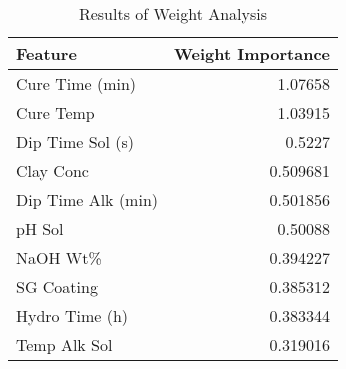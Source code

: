 
    \begin{table*}[h]
        \centering
        \begin{tabular}{lr}
\hline
 Feature            &   Weight Importance \\
\hline
 Cure Time (min)    &            1.07658  \\
 Cure Temp          &            1.03915  \\
 Dip Time Sol (s)   &            0.5227   \\
 Clay Conc          &            0.509681 \\
 Dip Time Alk (min) &            0.501856 \\
 pH Sol             &            0.50088  \\
 NaOH Wt\%          &            0.394227 \\
 SG Coating         &            0.385312 \\
 Hydro Time (h)     &            0.383344 \\
 Temp Alk Sol       &            0.319016 \\
\hline
\end{tabular}
        \caption{Results of Weight Analysis}
        \label{weight_analysis}
    \end{table*}
    
